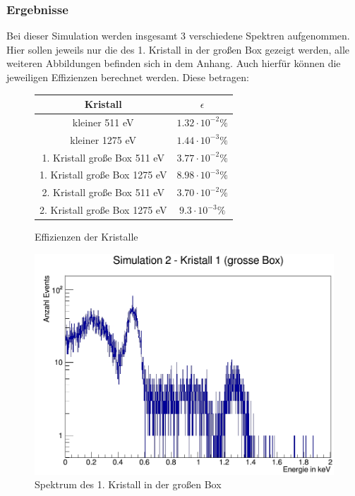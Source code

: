\documentclass[a4paper,11pt,twoside]{article}
\begin{document}
		\subsubsection{Ergebnisse}
			Bei dieser Simulation werden insgesamt 3 verschiedene Spektren aufgenommen. Hier sollen jeweils nur die des 1. Kristall in der großen Box gezeigt werden, alle weiteren Abbildungen befinden sich in dem Anhang. 
			Auch hierfür können die jeweiligen Effizienzen berechnet werden. Diese betragen: \\
			\begin{figure}[H]
			\begin{center}
			
			
			\begin{tabular}{|c|c|}
			\hline 
			\rule[-1ex]{0pt}{2.5ex} Kristall & $\epsilon$ \\ 
			\hline 
			\rule[-1ex]{0pt}{2.5ex} kleiner 511 eV & $1.32\cdot 10^{-2}\%$ \\ 
			\hline 
			\rule[-1ex]{0pt}{2.5ex} kleiner 1275 eV & $1.44\cdot 10^{-3}\%$ \\ 
			\hline 
			\rule[-1ex]{0pt}{2.5ex} 1. Kristall große Box 511 eV &  $3.77\cdot 10^{-2}\%$\\ 
			\hline 
			\rule[-1ex]{0pt}{2.5ex} 1. Kristall große Box 1275 eV & $8.98\cdot 10^{-3}\%$ \\ 
			\hline 
			\rule[-1ex]{0pt}{2.5ex} 2. Kristall große Box 511 eV & $3.70\cdot 10^{-2}\%$ \\ 
			\hline 
			\rule[-1ex]{0pt}{2.5ex} 2. Kristall große Box 1275 eV & $9.3\cdot 10^{-3}\%$ \\ 
			\hline 
			\end{tabular}
			\end{center}
			\caption{Effizienzen der Kristalle}
			\end{figure}
			
			\begin{figure}[H]
				\begin{center}
				\includegraphics[width=0.7\linewidth]{Simulation2(1KGB)_ganz}
				\caption{Spektrum des 1. Kristall in der großen Box}
				\label{S2_1KGB_ganz}
				\end{center}
			\end{figure}
			 
\end{document}

